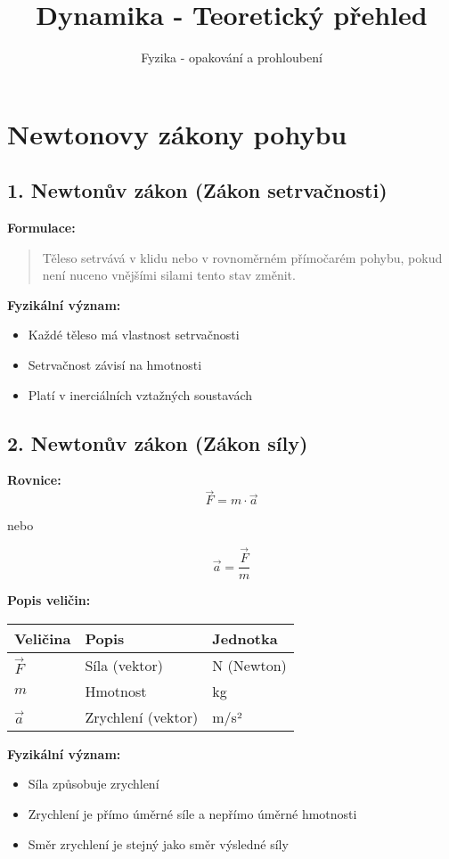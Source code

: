 \documentclass[11pt,a4paper]{article}
\title{Dynamika - Teoretický přehled}
\author{Fyzika - opakování a prohloubení}
\date{}
\begin{document}
\maketitle

\section{Newtonovy zákony pohybu}

\subsection{1. Newtonův zákon (Zákon setrvačnosti)}

\textbf{Formulace:}
\begin{quote}
Těleso setrvává v klidu nebo v rovnoměrném přímočarém pohybu, pokud není nuceno vnějšími silami tento stav změnit.
\end{quote}

\textbf{Fyzikální význam:}
\begin{itemize}
\item Každé těleso má vlastnost setrvačnosti
\item Setrvačnost závisí na hmotnosti
\item Platí v inerciálních vztažných soustavách
\end{itemize}

\subsection{2. Newtonův zákon (Zákon síly)}

\textbf{Rovnice:}
\[\vec{F} = m \cdot \vec{a}\]

nebo

\[\vec{a} = \frac{\vec{F}}{m}\]

\textbf{Popis veličin:}

\begin{longtable}{lll}
\toprule
Veličina & Popis & Jednotka \\
\midrule
$\vec{F}$ & Síla (vektor) & N (Newton) \\
$m$ & Hmotnost & kg \\
$\vec{a}$ & Zrychlení (vektor) & m/s² \\
\bottomrule
\end{longtable}

\textbf{Fyzikální význam:}
\begin{itemize}
\item Síla způsobuje zrychlení
\item Zrychlení je přímo úměrné síle a nepřímo úměrné hmotnosti
\item Směr zrychlení je stejný jako směr výsledné síly
\end{itemize}
\end{document}
